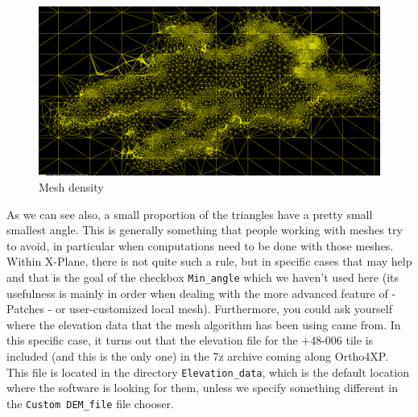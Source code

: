 \documentclass[12pt]{article}
\begin{document}
\begin{center}
\begin{figure}[!ht]
\begin{center}
\includegraphics[width=16cm]{Images/ouessant_step3.png}
\caption{\label{fig:plot_step2}Mesh density}
\end{center}
\end{figure}
\end{center}

As we can see also, a small proportion of the triangles have a pretty small smallest angle. This is generally something that people working with meshes try to avoid, in particular when computations need to be done with those meshes.
Within X-Plane, there is not quite such a rule, but in specific cases that may help and that is the goal of the checkbox {\tt Min\_angle} which we haven't used here (its usefulness is mainly in order when dealing with the more advanced feature of - Patches - or user-customized local mesh).
Furthermore, you could ask yourself where the elevation data that the mesh algorithm has been using came from. In this specific case, it turns out that the elevation file for the +48-006 tile is included (and this is the only one) in the 7z archive coming along Ortho4XP. This file is located in the directory {\tt Elevation\_data}, which is the default location where the software is looking for them, unless we specify something different in the {\tt Custom DEM\_file} file chooser.
\end{document}
